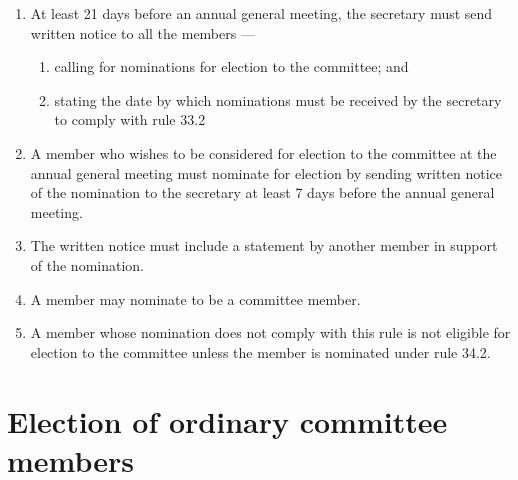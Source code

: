 \begin{enumerate}

\item At least 21 days before an annual general meeting, the secretary must send written notice to all the members ---

  \begin{enumerate}
  
  \item calling for nominations for election to the committee; and
  \item stating the date by which nominations must be received by the secretary to comply with rule 33.2
  \end{enumerate}
\item A member who wishes to be considered for election to the committee at the annual general meeting must nominate for election by sending written notice of the nomination to the secretary at least 7 days before the annual general meeting.
\item The written notice must include a statement by another member in support of the nomination.
\item A member may nominate to be a committee member.
\item A member whose nomination does not comply with this rule is not eligible for election to the committee unless the member is nominated under rule 34.2.
\end{enumerate}

\hypertarget{election-of-ordinary-committee-members}{%
\section{Election of ordinary committee members}\label{election-of-ordinary-committee-members}}

